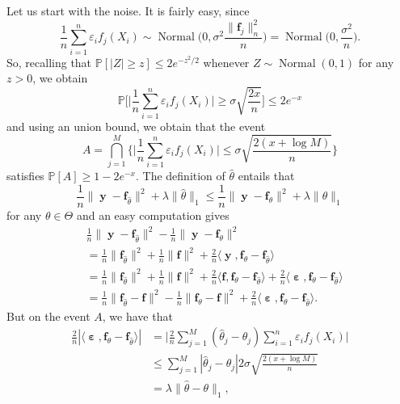 \documentclass[
	fontsize=11pt, %
	twoside=false, %
	numbers=noenddot, %
]{kaobook}
\renewcommand{\bf}{{\boldsymbol f}}
\DeclareMathOperator{\by}{{\boldsymbol y}}
\DeclareMathOperator{\beps}{\boldsymbol \varepsilon}
\DeclareMathOperator{\nor}{Normal}
\newcommand{\eps}{\varepsilon}
\renewcommand{\P}{\mathbb P}
\newcommand{\wh}{\widehat}
\newcommand{\norm}[1]{\| #1 \|}
\newcommand{\inr}[1]{\langle #1 \rangle}
\begin{document}
Let us start with the noise. It is fairly easy, since
\begin{equation*}
	\frac 1n \sum_{i=1}^n \eps_i f_j(X_i) \sim 
	\nor\Big( 0, \sigma^2 \frac{\norm{\bf_j}_n^2}{n} \Big) 
	= \nor\Big( 0, \frac{\sigma^2}{n} \Big).
\end{equation*}
So, recalling that $\P[|Z| \geq z] \leq 2e^{-z^2 / 2}$ whenever $Z \sim \nor(0, 1)$ for any $z > 0$,%
we obtain
\begin{equation*}
	\P \bigg[ \Big| \frac 1n \sum_{i=1}^n \eps_i f_j(X_i) \Big| \geq \sigma \sqrt{\frac{2 x}{n}} \bigg] \leq 2 e^{-x}
\end{equation*}
and using an union bound, we obtain that the event
\begin{equation*}
	A = \bigcap_{j=1}^M \bigg\{ \Big| \frac 1n \sum_{i=1}^n \eps_i f_j(X_i) \Big| \leq \sigma \sqrt{\frac{2 (x + \log M)}{n}} \bigg\}
\end{equation*}
satisfies $\P[A] \geq 1 - 2e^{-x}$.
The definition of $\wh \theta$ entails that
\begin{equation}
	\label{eq:proof-oracle-slow-step1}
	\frac 1n  \norm{\by - \bf_{\wh \theta}}^2 + \lambda \norm{\wh \theta}_1 
	\leq \frac 1n  \norm{\by - \bf_\theta}^2 + \lambda \norm{\theta}_1
\end{equation}
for any $\theta \in \Theta$ and an easy computation gives
\begin{equation}
	\label{eq:proof-oracle-slow-step2}
	\begin{split}
	&\frac 1n \norm{\by - \bf_{\wh \theta}}^2 - \frac 1n \norm{\by - \bf_\theta}^2 \\
	&= \frac 1n  \norm{\bf_{\wh \theta}}^2 + \frac 1n  \norm{\bf}^2 + \frac 2n  \inr{\by, \bf_{\theta} - \bf_{\wh \theta}} \\
	&= \frac 1n \norm{\bf_{\wh \theta}}^2 + \frac 1n \norm{\bf}^2 + \frac 2n  \inr{\bf, \bf_{\theta} - \bf_{\wh \theta}} + \frac 2n  \inr{\beps, \bf_{\theta} - \bf_{\wh \theta}} \\
	&= \frac 1n \norm{\bf_{\wh \theta} - \bf}^2 - \frac 1n \norm{\bf_\theta - \bf}^2 + 
	\frac 2n  \inr{\beps, \bf_{\theta} - \bf_{\wh \theta}}.
	\end{split}
\end{equation}
But on the event $A$, we have that
\begin{equation}
	\label{eq:proof-oracle-slow-step3}
	\begin{split}
	\frac 2n | \inr{\beps, \bf_{\theta} - \bf_{\wh \theta}} | 
	&= \Big| \frac 2n \sum_{j=1}^M (\wh \theta_j - \theta_j ) 
	\sum_{i=1}^n \eps_i f_j(X_i) \Big| \\
	&\leq \sum_{j=1}^M | \wh \theta_j - \theta_j | 2 \sigma \sqrt{\frac{2 (x + \log M)}{n}} \\
	&= \lambda \norm{\wh \theta - \theta}_1,	
	\end{split}
\end{equation}
\end{document}
